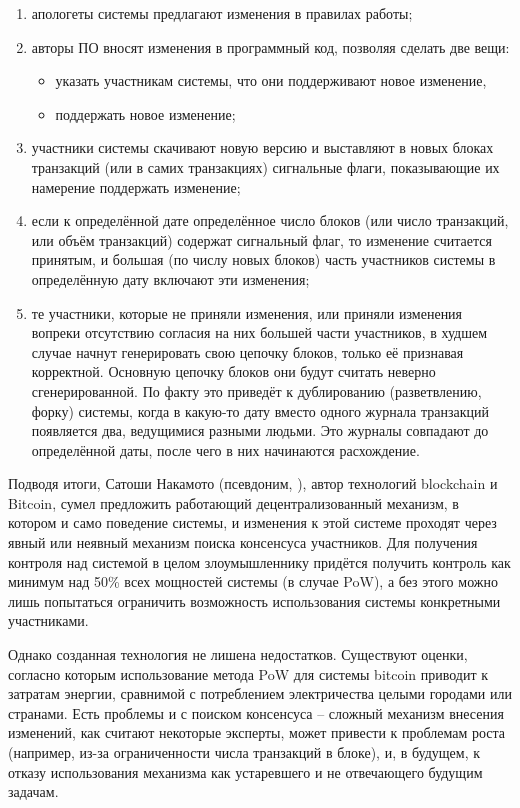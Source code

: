\begin{enumerate}
	\item апологеты системы предлагают изменения в правилах работы;
	\item авторы ПО вносят изменения в программный код, позволяя сделать две вещи:
	\begin{itemize}
		\item указать участникам системы, что они поддерживают новое изменение,
		\item поддержать новое изменение;
	\end{itemize}
	\item участники системы скачивают новую версию и выставляют в новых блоках транзакций (или в самих транзакциях) сигнальные флаги, показывающие их намерение поддержать изменение;
	\item если к определённой дате определённое число блоков (или число транзакций, или объём транзакций) содержат сигнальный флаг, то изменение считается принятым, и большая (по числу новых блоков) часть участников системы в определённую дату включают эти изменения;
	\item те участники, которые не приняли изменения, или приняли изменения вопреки отсутствию согласия на них большей части участников, в худшем случае начнут генерировать свою цепочку блоков, только её признавая корректной. Основную цепочку блоков они будут считать неверно сгенерированной. По факту это приведёт к дублированию (разветвлению, форку) системы, когда в какую-то дату вместо одного журнала транзакций появляется два, ведущимися разными людьми. Это журналы совпадают до определённой даты, после чего в них начинаются расхождение.
\end{enumerate}

Подводя итоги, Сатоши Накамото (псевдоним, ), автор технологий blockchain и Bitcoin, сумел предложить работающий децентрализованный механизм, в котором и само поведение системы, и изменения к этой системе проходят через явный или неявный механизм поиска консенсуса участников. Для получения контроля над системой в целом злоумышленнику придётся получить контроль как минимум над 50\% всех мощностей системы (в случае PoW), а без этого можно лишь попытаться ограничить возможность использования системы конкретными участниками.

Однако созданная технология не лишена недостатков. Существуют оценки, согласно которым использование метода PoW для системы bitcoin приводит к затратам энергии, сравнимой с потреблением электричества целыми городами или странами. Есть проблемы и с поиском консенсуса -- сложный механизм внесения изменений, как считают некоторые эксперты, может привести к проблемам роста (например, из-за ограниченности числа транзакций в блоке), и, в будущем, к отказу использования механизма как устаревшего и не отвечающего будущим задачам.


